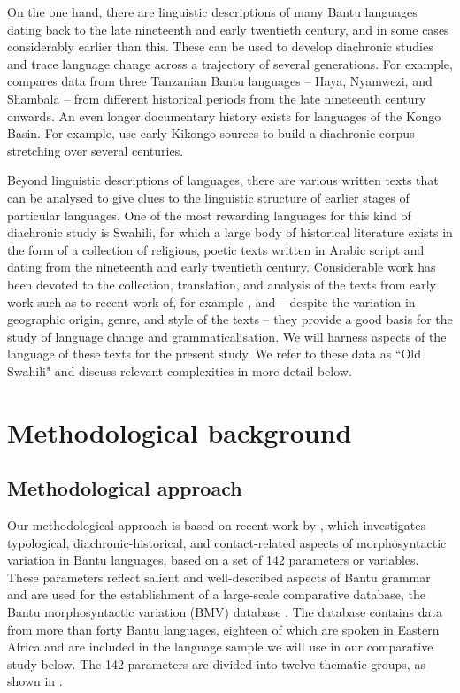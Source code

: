 \documentclass[output=paper]{langscibook}
\begin{document}
On the one hand, there are linguistic descriptions of many Bantu languages dating back to the late nineteenth and early twentieth century, and in some cases considerably earlier than this. These can be used to develop diachronic studies and trace language change across a trajectory of several generations. For example, \citet{Balestrieri2017} compares data from three Tanzanian Bantu languages -- Haya, Nyamwezi, and Shambala -- from different historical periods from the late nineteenth century onwards. An even longer documentary history exists for languages of the Kongo Basin. For example, \citet{DomBostoen2015} use early Kikongo sources to build a diachronic corpus stretching over several centuries. 

Beyond linguistic descriptions of languages, there are various written texts that can be analysed to give clues to the linguistic structure of earlier stages of particular languages. One of the most rewarding languages for this kind of diachronic study is Swahili, for which a large body of historical literature exists in the form of a collection of religious, poetic texts written in Arabic script and dating from the nineteenth and early twentieth century. Considerable work has been devoted to the collection, translation, and analysis of the texts from early work such as \citet{Taylor1891} to recent work of, for example \citet{Vierke2011}, and -- despite the variation in geographic origin, genre, and style of the texts -- they provide a good basis for the study of language change and grammaticalisation. We will harness aspects of the language of these texts for the present study. We refer to these data as ``Old Swahili" and discuss relevant complexities in more detail below. 

\section{Methodological background}\label{sec:marten:2}
\subsection{Methodological approach}\label{sec:marten:2.1}

Our methodological approach is based on recent work by \citet{GuéroisEtAl2017}, which investigates typological, diachronic-historical, and contact-related aspects of morphosyntactic variation in Bantu languages, based on a set of 142 parameters or variables. These parameters reflect salient and well-described aspects of Bantu grammar and are used for the establishment of a large-scale comparative database, the Bantu morphosyntactic variation (BMV) database \citep{MartenEtAl2018}. The database contains data from more than forty Bantu languages, eighteen of which are spoken in Eastern Africa and are included in the language sample we will use in our comparative study below. The 142 parameters are divided into twelve thematic groups, as shown in .
\end{document}
